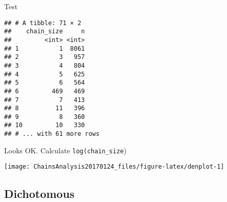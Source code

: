 \documentclass[]{article}
\newenvironment{Shaded}{\begin{snugshade}}{\end{snugshade}}
\newcommand{\KeywordTok}[1]{\textcolor[rgb]{0.13,0.29,0.53}{\textbf{{#1}}}}
\newcommand{\DataTypeTok}[1]{\textcolor[rgb]{0.13,0.29,0.53}{{#1}}}
\newcommand{\DecValTok}[1]{\textcolor[rgb]{0.00,0.00,0.81}{{#1}}}
\newcommand{\StringTok}[1]{\textcolor[rgb]{0.31,0.60,0.02}{{#1}}}
\newcommand{\OtherTok}[1]{\textcolor[rgb]{0.56,0.35,0.01}{{#1}}}
\newcommand{\NormalTok}[1]{{#1}}
\begin{document}
Test

\begin{Shaded}
\end{Shaded}

\begin{verbatim}
## # A tibble: 71 × 2
##    chain_size     n
##         <int> <int>
## 1           1  8061
## 2           3   957
## 3           4   804
## 4           5   625
## 5           6   564
## 6         469   469
## 7           7   413
## 8          11   396
## 9           8   360
## 10         10   330
## # ... with 61 more rows
\end{verbatim}

Looks OK. Calculate \texttt{log(chain\_size})

\begin{Shaded}
\end{Shaded}

\begin{Shaded}
\end{Shaded}

\begin{center}\texttt{[image: ChainsAnalysis20170124\_files/figure-latex/denplot-1]} \end{center}

\subsection{Dichotomous}\label{dichotomous}

\begin{Shaded}
\end{Shaded}
\end{document}
